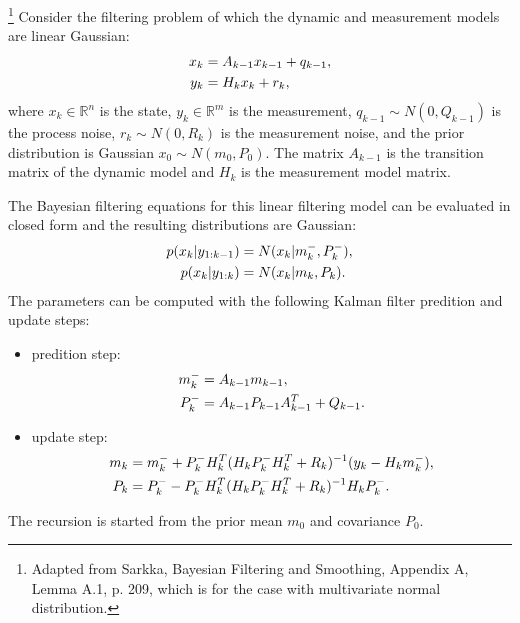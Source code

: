 \begin{theorem} \label{T:kalman}
\footnote{Adapted from Sarkka, Bayesian Filtering and Smoothing, Appendix A, 
	Lemma A.1, p. 209, which is for the case with multivariate normal
	distribution.}
Consider the filtering problem of which the dynamic and measurement models are linear Gaussian:
\begin{align}
  x_k &= A_{k-1} x_{k-1} + q_{k-1}, \notag \\
  y_k &= H_k x_k + r_k,
\end{align}
where $x_k\in \mathbb{R}^n$ is the state, $y_k\in\mathbb{R}^m$ is the
measurement, $q_{k-1}\sim N(0,Q_{k-1})$ is the process noise, 
$r_k\sim N(0,R_k)$ is the measurement noise, and the prior distribution is
Gaussian $x_0\sim N(m_0,P_0)$. The matrix $A_{k-1}$ is the transition matrix of
the dynamic model and $H_k$ is the measurement model matrix. 

The Bayesian filtering equations for this linear filtering model can be
evaluated in closed form and the resulting distributions are Gaussian:
\begin{align}
  p(x_k|y_{1:k-1}) &= N(x_k| m_k^-, P_k^-), \notag \\
  p(x_k|y_{1:k}) &= N(x_k| m_k, P_k).
\end{align}
The parameters can be computed with the following Kalman filter predition and
update steps:
\begin{itemize}
\item predition step:
\begin{align}
  m_k^- &= A_{k-1}m_{k-1}, \notag \\
  P_k^- &= A_{k-1} P_{k-1} A_{k-1}^T + Q_{k-1}.
\end{align}
\item update step:
\begin{align}
  m_k &= m_k^- + P_k^- H_k^T (H_k P_k^- H_k^T + R_k)^{-1} (y_k-H_km_k^-), \notag \\
  P_k &= P_k^- - P_k^- H_k^T (H_k P_k^- H_k^T + R_k)^{-1} H_k P_k^-. 
\end{align}
\end{itemize}

The recursion is started from the prior mean $m_0$ and covariance $P_0$.
\end{theorem}
